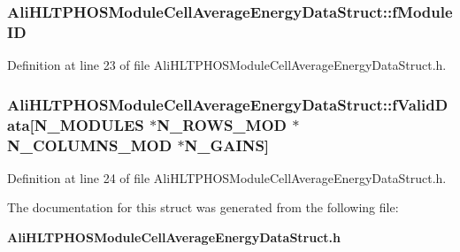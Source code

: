 \subsubsection{ {\bf Ali\-HLTPHOSModule\-Cell\-Average\-Energy\-Data\-Struct::f\-Module\-ID}}\label{structAliHLTPHOSModuleCellAverageEnergyDataStruct_o0}




Definition at line 23 of file Ali\-HLTPHOSModule\-Cell\-Average\-Energy\-Data\-Struct.h.
\subsubsection{ {\bf Ali\-HLTPHOSModule\-Cell\-Average\-Energy\-Data\-Struct::f\-Valid\-Data}[N\_\-MODULES $\ast$N\_\-ROWS\_\-MOD $\ast$N\_\-COLUMNS\_\-MOD $\ast$N\_\-GAINS]}\label{structAliHLTPHOSModuleCellAverageEnergyDataStruct_o1}




Definition at line 24 of file Ali\-HLTPHOSModule\-Cell\-Average\-Energy\-Data\-Struct.h.

The documentation for this struct was generated from the following file:\begin{CompactItemize}
\item 
{\bf Ali\-HLTPHOSModule\-Cell\-Average\-Energy\-Data\-Struct.h}\end{CompactItemize}
